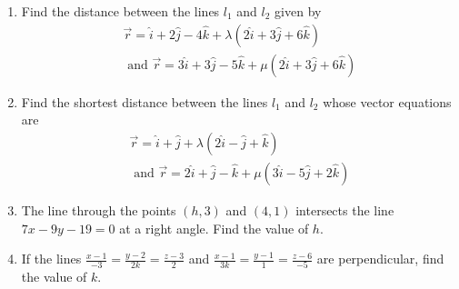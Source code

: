 \begin{enumerate}[label=\thesubsection.\arabic*, ref=\thesubsection.\theenumi]
\item Find the distance between the lines $l_1$ and $l_2$ given by
\begin{align}
\overrightarrow{r}= \hat{i}+ 2 \hat{j}- 4 \hat{k}+ \lambda(2 \hat{i}+ 3 \hat{j}+ 6 \hat{k}) \\
\text{ and }\overrightarrow{r}= 3 \hat{i}+ 3 \hat{j}- 5 \hat{k}+ \mu(2 \hat{i}+ 3 \hat{j}+ 6 \hat{k}) 
\end{align}
\item Find the shortest distance between the lines $l_1$ and $l_2$ whose vector equations are
\begin{align}
\overrightarrow{r}= \hat{i}+ \hat{j}+ \lambda(2 \hat{i}- \hat{j}+ \hat{k}) \\
\text{ and } \overrightarrow{r}= 2 \hat{i}+ \hat{j}- \hat{k}+ \mu(3 \hat{i}- 5 \hat{j}+ 2 \hat{k}) 
\end{align}
\item The line through the points $(h,   3)$ and $(4,   1)$ intersects the line $7x- 9y- 19= 0$ at a right angle. Find the value of $h$.
\label{chapters/11/10/3/10}
\\
\solution

	\item If the lines $\frac{x-1}{-3} = \frac{y-2}{2k} = \frac{z-3}{2}$ and  $\frac{x-1}{3k} = \frac{y-1}{1} = \frac{z-6}{-5}$ are perpendicular,   find the value of $k$.\\
    \solution
		
		
\end{enumerate}
